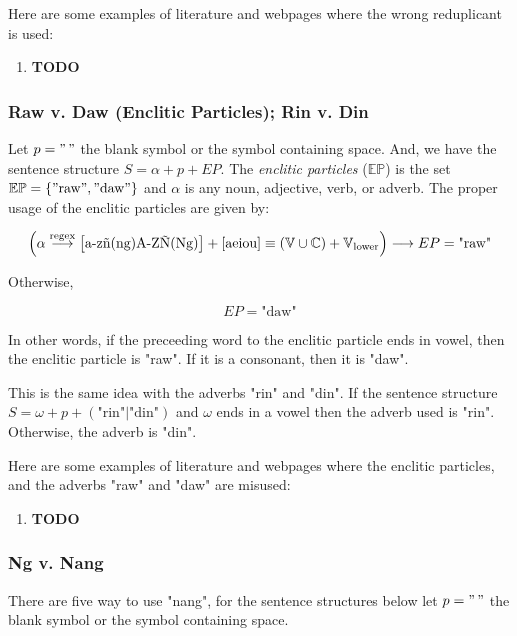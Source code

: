 \begin{example}
      Here are some examples of literature and webpages where the wrong reduplicant is
      used:
\end{example}
\begin{enumerate}
      \item \textbf{TODO}
\end{enumerate}

\subsubsection{Raw v. Daw (Enclitic Particles); Rin v. Din}

Let \(p = "\,"\) the blank symbol or the symbol containing space. And, we have the
sentence structure \(S = \alpha + p + EP\). The \textit{enclitic particles}
(\(\mathbb{EP}\)) is the set \(\mathbb{EP} = \{"\text{raw}", "\text{daw}"\}\) and
\(\alpha\) is any noun, adjective, verb, or adverb. The proper usage of the enclitic
particles are given by:

\[
      \left(\alpha \overset{\text{regex}}{\longrightarrow} \left[\text{a-zñ(ng)A-ZÑ(Ng)}\right]+\left[\text{aeiou}\right] \equiv (\mathbb{V}\cup\mathbb{C}) + \mathbb{V}_\text{lower}\right)
      \longrightarrow EP = \text{"raw"}
\]

Otherwise,

\[
      EP = \text{"daw"}
\]

In other words, if the preceeding word to the enclitic particle ends in vowel,
then the enclitic particle is "raw". If it is a consonant, then it is "daw".

This is the same idea with the adverbs "rin" and "din". If the sentence structure
\(S = \omega + p + (\text{"rin"}|\text{"din"})\) and \(\omega\) ends in a vowel
then the adverb used is "rin". Otherwise, the adverb is "din".

Here are some examples of literature and webpages where the enclitic particles,
and the adverbs "raw" and "daw" are misused:
\begin{enumerate}
      \item \textbf{TODO}
\end{enumerate}

\subsubsection{Ng v. Nang}

There are five way to use "nang", for the sentence structures below
let \(p = "\,"\) the blank symbol or the symbol containing space.

